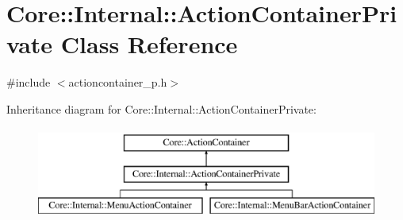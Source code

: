 \hypertarget{class_core_1_1_internal_1_1_action_container_private}{\section{\-Core\-:\-:\-Internal\-:\-:\-Action\-Container\-Private \-Class \-Reference}
\label{class_core_1_1_internal_1_1_action_container_private}
}


{\ttfamily \#include $<$actioncontainer\-\_\-p.\-h$>$}

\-Inheritance diagram for \-Core\-:\-:\-Internal\-:\-:\-Action\-Container\-Private\-:\begin{figure}[H]
\begin{center}
\leavevmode
\includegraphics[height=3.000000cm]{class_core_1_1_internal_1_1_action_container_private}
\end{center}
\end{figure}
